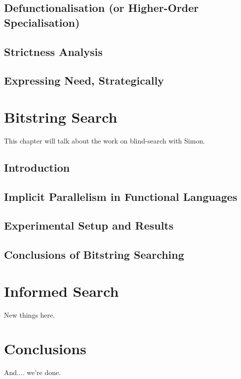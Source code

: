 \documentclass[justified]{tufte-book}
\begin{document}
    

    \section{Defunctionalisation (or Higher-Order Specialisation)}
    

    \section{Strictness Analysis}
    

    \section{Expressing Need, Strategically}
    
    
\chapter{Bitstring Search}

    This chapter will talk about the work on blind-search with Simon.

    \section{Introduction}
    

    \section{Implicit Parallelism in Functional Languages}
    \label{sec:blind-ParFunc}
    

    \section{Experimental Setup and Results}
    \label{sec:blind-Results}
    

    \section{Conclusions of Bitstring Searching}
    \label{sec:blind-Conclusion}
    

\chapter{Informed Search}

    New things here.
    \label{sec:informed-search}
    

\chapter{Conclusions}

    And.... we're done.

\backmatter



\end{document}
